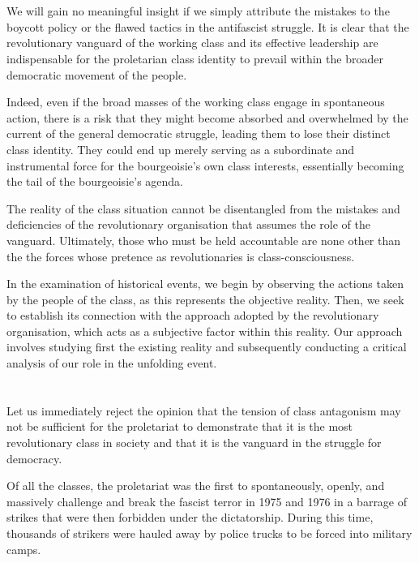 \documentclass[a4paper,11pt,onesided]{report}
\begin{document}
\section{}
We will gain no meaningful insight
if we simply attribute the mistakes 
to the boycott policy 
or the flawed tactics in the antifascist struggle. 
It is clear that the revolutionary vanguard 
of the working class 
and its effective leadership are indispensable 
for the proletarian class identity to prevail 
within the broader democratic movement of the people.

Indeed, 
even if the broad masses of the working class 
engage in spontaneous action, 
there is a risk that they might 
become absorbed and overwhelmed by 
the current of the general democratic struggle, 
leading them to lose their distinct class identity. 
They could end up merely serving 
as a subordinate and instrumental force 
for the bourgeoisie's own class interests, 
essentially becoming the tail of the bourgeoisie's agenda.

The reality of the class situation 
cannot be disentangled from 
the mistakes and deficiencies 
of the revolutionary organisation 
that assumes the role of the vanguard. 
Ultimately, 
those who must be held accountable are none other than the
the forces whose pretence as revolutionaries is class-consciousness.

In the examination of historical events,
we begin by observing the actions taken by the people of the class,
as this represents the objective reality.
Then, we seek to establish its connection
with the approach adopted by the revolutionary organisation,
which acts as a subjective factor within this reality.
Our approach involves studying first the existing reality 
and subsequently conducting a critical analysis 
of our role in the unfolding event.

\section{}

Let us immediately reject the opinion 
that the tension of class antagonism may not be sufficient for the proletariat 
to demonstrate that it is the most revolutionary class in society 
and that it is the vanguard in the struggle for democracy.

Of all the classes, 
the proletariat was the first to spontaneously, openly, and massively 
challenge and break 
the fascist terror in 1975 and 1976 
in a barrage of strikes that 
were then forbidden under the dictatorship. 
During this time, 
thousands of strikers were 
hauled away by police trucks 
to be forced into military camps.
\end{document}
